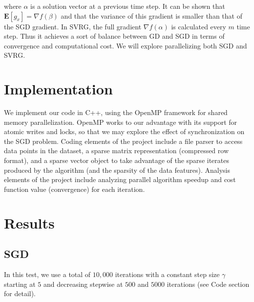 \documentclass{article}
\begin{document}
where $\alpha$ is a solution vector at a previous time step. It can be shown that $\mathbf{E}[g_x] = \nabla f(\beta)$ and that the variance of this gradient is smaller than that of the SGD gradient. In SVRG, the full gradient $\nabla f(\alpha)$ is calculated every $m$ time step. Thus it achieves a sort of balance between GD and SGD in terms of convergence and computational cost. We will explore parallelizing both SGD and SVRG.

\section{Implementation}
We implement our code in C++, using the OpenMP framework for shared memory parallelization. OpenMP works to our advantage with its support for atomic writes and locks, so that we may explore the effect of synchronization on the SGD problem. Coding elements of the project include a file parser to access data points in the dataset, a sparse matrix representation (compressed row format), and a sparse vector object to take advantage of the sparse iterates produced by the algorithm (and the sparsity of the data features). Analysis elements of the project include analyzing parallel algorithm speedup and cost function value (convergence) for each iteration.

\section{Results}

\subsection{SGD}
In this test, we use a total of $10,000$ iterations with a constant step size $\gamma$ starting at $5$ and decreasing stepwise at $500$ and $5000$ iterations (see Code section for detail).
\end{document}
